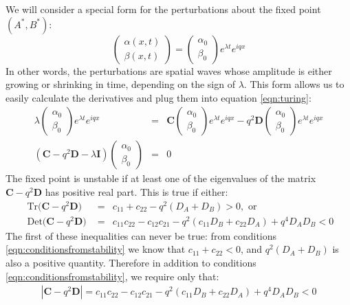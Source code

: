 \documentclass{article}
\begin{document}
We will consider a special form for the perturbations about the fixed point $(A^*, B^*)$:
\[  \begin{pmatrix} \alpha (x,t) \\ \beta (x,t) \end{pmatrix} =  \begin{pmatrix} \alpha_0 \\ \beta_0 \end{pmatrix} e^{\lambda t} e^{iqx} \]
In other words, the perturbations are spatial waves whose amplitude is either growing or shrinking in time, depending on the sign of $\lambda$. This form allows us to easily calculate the derivatives and plug them into equation \ref{eqn:turing}:
\begin{eqnarray*}
\lambda \begin{pmatrix} \alpha_0 \\ \beta_0 \end{pmatrix} e^{\lambda t} e^{iqx} & = & \mathbf{C} \begin{pmatrix} \alpha_0 \\ \beta_0 \end{pmatrix} e^{\lambda t} e^{iqx} - q^2 \mathbf{D} \begin{pmatrix} \alpha_0 \\ \beta_0 \end{pmatrix} e^{\lambda t} e^{iqx}\\
\left(  \mathbf{C} -  q^2 \mathbf{D}  - \lambda \mathbf{I} \right) \begin{pmatrix} \alpha_0 \\ \beta_0 \end{pmatrix} & = & 0
\end{eqnarray*}
The fixed point is unstable if at least one of the eigenvalues of the matrix $\mathbf{C} -q^2 \mathbf{D}$ has  positive real part. This is true if either:
\begin{eqnarray*}
\textrm{ Tr($\mathbf{C}  - q^2 \mathbf{D}$) } &= &c_{11} + c_{22} - q^2 \left(D_A + D_B \right) > 0, \textrm{ or }\\
\textrm{ Det($\mathbf{C} - q^2 \mathbf{D}$) } & = & c_{11}c_{22} - c_{12} c_{21}  - q^2 \left( c_{11} D_B + c_{22} D_A \right) + q^4 D_A D_B < 0
\end{eqnarray*}
The first of these inequalities can never be true: from conditions \ref{eqn:conditionsfromstability} we know that $c_{11} + c_{22} < 0$, and $q^2(D_A + D_B)$ is also a positive quantity. Therefore in addition to conditions \ref{eqn:conditionsfromstability}, we require only that:
\begin{eqnarray}
\left| \mathbf{C} - q^2 \mathbf{D} \right| = c_{11}c_{22} - c_{12} c_{21}  - q^2 \left( c_{11} D_B + c_{22} D_A \right) + q^4 D_A D_B < 0 \label{eqn:conditioninstability}
\end{eqnarray}
\end{document}
